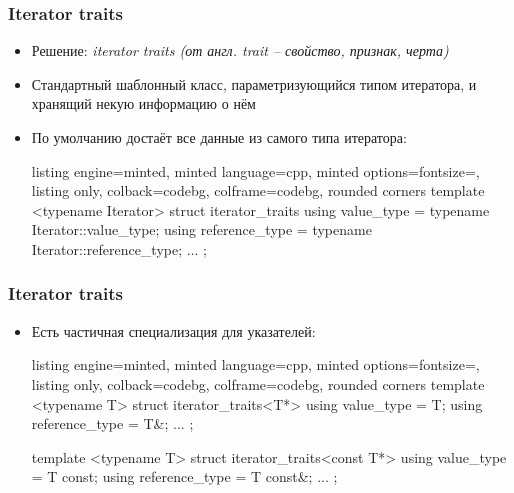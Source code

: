 \documentclass[10pt]{beamer}
\begin{document}
\begin{frame}[fragile]
\frametitle{Iterator traits}
\begin{itemize}
\item Решение: \textit{iterator traits (от англ. trait -- свойство, признак, черта)}
\pause
\item Стандартный шаблонный класс, параметризующийся типом итератора, и хранящий некую информацию о нём
\pause
\item По умолчанию достаёт все данные из самого типа итератора:
\begin{tcblisting}{listing engine=minted, minted language=cpp, minted options={fontsize=\scriptsize}, listing only, colback=codebg, colframe=codebg, rounded corners}
template <typename Iterator>
struct iterator_traits {
  using value_type = typename Iterator::value_type;
  using reference_type = typename Iterator::reference_type;
  ...
};
\end{tcblisting}
\end{itemize}
\end{frame}

\begin{frame}[fragile]
\frametitle{Iterator traits}
\begin{itemize}
\item Есть частичная специализация для указателей:
\begin{tcblisting}{listing engine=minted, minted language=cpp, minted options={fontsize=\scriptsize}, listing only, colback=codebg, colframe=codebg, rounded corners}
template <typename T>
struct iterator_traits<T*> {
  using value_type = T;
  using reference_type = T&;
  ...
};

template <typename T>
struct iterator_traits<const T*> {
  using value_type = T const;
  using reference_type = T const&;
  ...
};
\end{tcblisting}
\end{itemize}
\end{frame}
\end{document}
